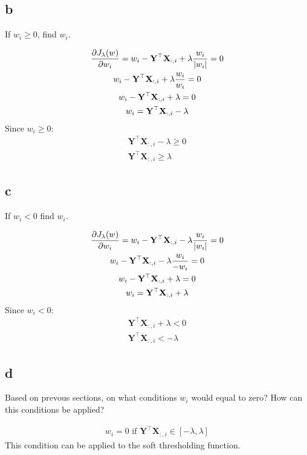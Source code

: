 \documentclass[12pt]{article}
\begin{document}
\subsection{b}
If $w_i \geq 0$, find $w_i$.
\begin{qsolve}
    \begin{gather*}
        \frac{\partial J_{\lambda}(w)}{\partial w_i} = w_i - \mathbf{Y}^\top \mathbf{X}_{:,i} + \lambda \frac{w_i}{\abs{w_i}} = 0\\
        w_i - \mathbf{Y}^\top \mathbf{X}_{:,i} + \lambda \frac{w_i}{w_i} = 0\\
        w_i - \mathbf{Y}^\top \mathbf{X}_{:,i} + \lambda = 0\\
        w_i = \mathbf{Y}^\top \mathbf{X}_{:,i} - \lambda
    \end{gather*}
    Since $w_i \geq 0$:
    \begin{gather*}
        \mathbf{Y}^\top \mathbf{X}_{:,i} - \lambda \geq 0\\
        \mathbf{Y}^\top \mathbf{X}_{:,i} \geq \lambda
    \end{gather*}
\end{qsolve}
\subsection{c}
If $w_i < 0$ find $w_i$.
\begin{qsolve}
    \begin{gather*}
        \frac{\partial J_{\lambda}(w)}{\partial w_i} = w_i - \mathbf{Y}^\top \mathbf{X}_{:,i} - \lambda \frac{w_i}{\abs{w_i}} = 0\\
        w_i - \mathbf{Y}^\top \mathbf{X}_{:,i} - \lambda \frac{w_i}{-w_i} = 0\\
        w_i - \mathbf{Y}^\top \mathbf{X}_{:,i} + \lambda = 0\\
        w_i = \mathbf{Y}^\top \mathbf{X}_{:,i} + \lambda
    \end{gather*}
    Since $w_i < 0$:
    \begin{gather*}
        \mathbf{Y}^\top \mathbf{X}_{:,i} + \lambda < 0\\
        \mathbf{Y}^\top \mathbf{X}_{:,i} < -\lambda
    \end{gather*}
\end{qsolve}
\subsection{d}
Based on prevous sections, on what conditions $w_i$ would equal to zero? How can this conditions be applied?
\begin{qsolve}
    \begin{gather*}
        w_i = 0 \text{ if } \mathbf{Y}^\top \mathbf{X}_{:,i} \in [-\lambda, \lambda]
    \end{gather*}
    This condition can be applied to the soft thresholding function.
\end{qsolve}
\end{document}
